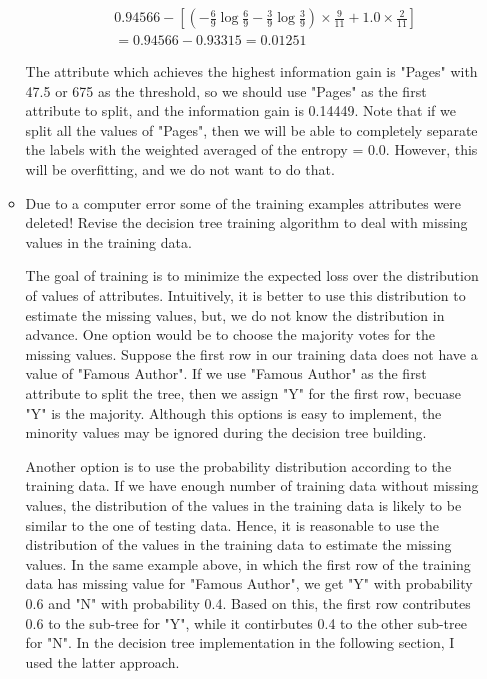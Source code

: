 \begin{enumerate}
\begin{itemize}
\begin{itemize}
\begin{eqnarray*}
0.94566 - \left[ \left( -\frac{6}{9} \log \frac{6}{9} -\frac{3}{9} \log \frac{3}{9} \right) \times \frac{9}{11} + 1.0 \times \frac{2}{11} \right]\\ = 0.94566 - 0.93315 = 0.01251
\end{eqnarray*}
\end{itemize}
The attribute which achieves the highest information gain is "Pages" with 47.5 or 675 as the threshold, so we should use "Pages" as the first attribute to split, and the information gain is 0.14449.
Note that if we split all the values of "Pages", then we will be able to completely separate the labels with the weighted averaged of the entropy = 0.0. However, this will be overfitting, and we do not want to do that.

\item Due to a computer error some of the training examples attributes were deleted! Revise the decision tree training algorithm to deal with missing values in the training data.

The goal of training is to minimize the expected loss over the distribution of values of attributes. Intuitively, it is better to use this distribution to estimate the missing values, but, we do not know the distribution in advance. One option would be to choose the majority votes for the missing values. Suppose the first row in our training data does not have a value of "Famous Author". If we use "Famous Author" as the first attribute to split the tree, then we assign "Y" for the first row, becuase "Y" is the majority. Although this options is easy to implement, the minority values may be ignored during the decision tree building.

Another option is to use the probability distribution according to the training data. If we have enough number of training data without missing values, the distribution of the values in the training data is likely to be similar to the one of testing data. Hence, it is reasonable to use the distribution of the values in the training data to estimate the missing values. In the same example above, in which the first row of the training data has missing value for "Famous Author", we get "Y" with probability 0.6 and "N" with probability 0.4. Based on this, the first row contributes 0.6 to the sub-tree for "Y", while it contirbutes 0.4 to the other sub-tree for "N". In the decision tree implementation in the following section, I used the latter approach.
\end{itemize}


\end{enumerate}
